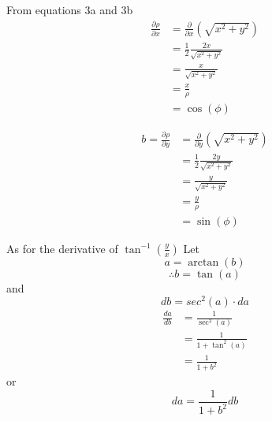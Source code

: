 \documentclass[11pt]{article}
\begin{document}
From equations 3a and 3b \begin{equation} \label{eq11112}
\begin{split}
\frac{\partial \rho}{\partial x} & = \frac{\partial }{\partial x} \left( \sqrt{x^2 + y^2} \right) \\ & = \frac{1}{2} \frac{2 x}{\sqrt{x^2 + y^2}} \\ & = \frac{x}{\sqrt{x^2 + y^2}}  \\ & = \frac{x}{\rho} \\ & = \cos(\phi)
\end{split}
\end{equation}

\begin{equation} \label{eq13312}
\begin{split}b =
\frac{\partial \rho}{\partial y} & = \frac{\partial }{\partial y} \left( \sqrt{x^2 + y^2} \right) \\ & = \frac{1}{2} \frac{2 y}{\sqrt{x^2 + y^2}} \\ & = \frac{y}{\sqrt{x^2 + y^2}}  \\ & = \frac{y}{\rho} \\ & = \sin(\phi)
\end{split}
\end{equation}

As for the derivative of \(\tan^{-1}\left( \frac{y}{x} \right)\) Let
\[a = \arctan(b)\] \[\therefore b = \tan(a)\] and
\[db = sec^2(a) \cdot da\] \begin{equation} \label{eq13313}
\begin{split}
\frac{da}{db} & = \frac{1}{\sec^2(a)} \\ & = \frac{1}{1 + \tan^2(a)} \\ & = \frac{1}{1 + b^2} 
\end{split}
\end{equation} or \[da = \frac{1}{1 + b^2} db \]
\end{document}
